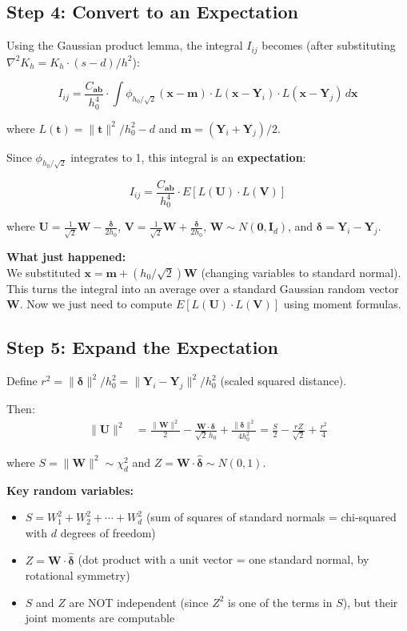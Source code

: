 \documentclass[12pt]{article}
\newcommand{\keyword}[1]{\textbf{\textcolor{blue!70!black}{#1}}}
\newcommand{\note}[1]{\begin{tcolorbox}[colback=yellow!5,colframe=yellow!60!black,breakable]\small #1\end{tcolorbox}}
\begin{document}
\subsection{Step 4: Convert to an Expectation}

Using the Gaussian product lemma, the integral $I_{ij}$ becomes (after substituting $\nabla^2 K_h = K_h \cdot (s-d)/h^2$):

$$I_{ij} = \frac{C_{\mathbf{ab}}}{h_0^4} \cdot \int \phi_{h_0/\sqrt{2}}(\mathbf{x}-\mathbf{m}) \cdot L(\mathbf{x}-\mathbf{Y}_i) \cdot L(\mathbf{x}-\mathbf{Y}_j)\,d\mathbf{x}$$

where $L(\mathbf{t}) = \|\mathbf{t}\|^2/h_0^2 - d$ and $\mathbf{m} = (\mathbf{Y}_i+\mathbf{Y}_j)/2$.

Since $\phi_{h_0/\sqrt{2}}$ integrates to 1, this integral is an \keyword{expectation}:

$$I_{ij} = \frac{C_{\mathbf{ab}}}{h_0^4} \cdot E\!\left[L(\mathbf{U})\cdot L(\mathbf{V})\right]$$

where $\mathbf{U} = \frac{1}{\sqrt{2}}\mathbf{W} - \frac{\bm\delta}{2h_0}$, $\mathbf{V} = \frac{1}{\sqrt{2}}\mathbf{W} + \frac{\bm\delta}{2h_0}$, $\mathbf{W}\sim N(\mathbf{0},\mathbf{I}_d)$, and $\bm\delta = \mathbf{Y}_i-\mathbf{Y}_j$.

\note{
\textbf{What just happened:}\\
We substituted $\mathbf{x} = \mathbf{m} + (h_0/\sqrt{2})\mathbf{W}$ (changing variables to standard normal). This turns the integral into an average over a standard Gaussian random vector $\mathbf{W}$. Now we just need to compute $E[L(\mathbf{U})\cdot L(\mathbf{V})]$ using moment formulas.
}

\subsection{Step 5: Expand the Expectation}

Define $r^2 = \|\bm\delta\|^2/h_0^2 = \|\mathbf{Y}_i-\mathbf{Y}_j\|^2/h_0^2$ (scaled squared distance).

Then:
\begin{align*}
\|\mathbf{U}\|^2 &= \frac{\|\mathbf{W}\|^2}{2} - \frac{\mathbf{W}\cdot\bm\delta}{\sqrt{2}\,h_0} + \frac{\|\bm\delta\|^2}{4h_0^2} = \frac{S}{2} - \frac{rZ}{\sqrt{2}} + \frac{r^2}{4}
\end{align*}

where $S = \|\mathbf{W}\|^2 \sim \chi^2_d$ and $Z = \mathbf{W}\cdot\hat{\bm\delta} \sim N(0,1)$.

\note{
\textbf{Key random variables:}
\begin{itemize}
\item $S = W_1^2 + W_2^2 + \cdots + W_d^2$ (sum of squares of standard normals = chi-squared with $d$ degrees of freedom)
\item $Z = \mathbf{W}\cdot\hat{\bm\delta}$ (dot product with a unit vector = one standard normal, by rotational symmetry)
\item $S$ and $Z$ are NOT independent (since $Z^2$ is one of the terms in $S$), but their joint moments are computable
\end{itemize}
}
\end{document}
